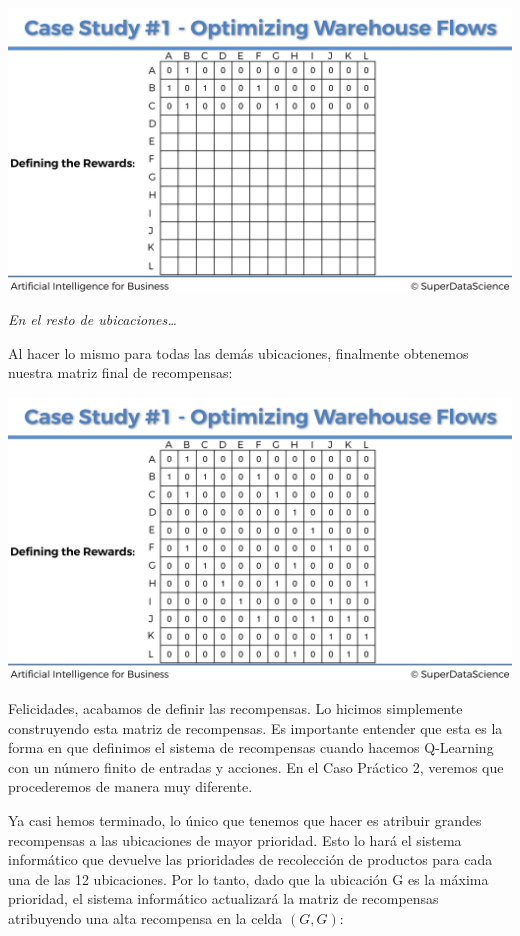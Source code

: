 \documentclass[
]{book}
\begin{document}
\includegraphics{Images/Rewards_Matrix_3.png}

\emph{En el resto de ubicaciones\ldots{}}

Al hacer lo mismo para todas las demás ubicaciones, finalmente obtenemos nuestra matriz final de recompensas:

\includegraphics{Images/Rewards_Matrix_4.png}

Felicidades, acabamos de definir las recompensas. Lo hicimos simplemente construyendo esta matriz de recompensas. Es importante entender que esta es la forma en que definimos el sistema de recompensas cuando hacemos Q-Learning con un número finito de entradas y acciones. En el Caso Práctico 2, veremos que procederemos de manera muy diferente.

Ya casi hemos terminado, lo único que tenemos que hacer es atribuir grandes recompensas a las ubicaciones de mayor prioridad. Esto lo hará el sistema informático que devuelve las prioridades de recolección de productos para cada una de las 12 ubicaciones. Por lo tanto, dado que la ubicación G es la máxima prioridad, el sistema informático actualizará la matriz de recompensas atribuyendo una alta recompensa en la celda \((G, G)\):
\end{document}
